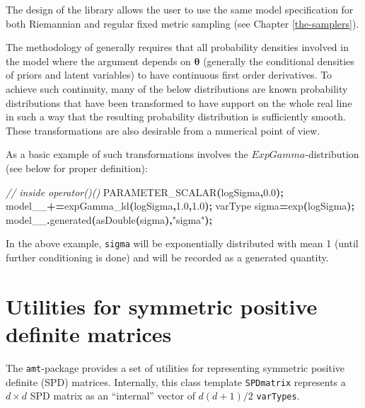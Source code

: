 \documentclass[
]{book}
\newenvironment{Shaded}{\begin{snugshade}}{\end{snugshade}}
\newcommand{\CommentTok}[1]{\textcolor[rgb]{0.56,0.35,0.01}{\textit{#1}}}
\newcommand{\FloatTok}[1]{\textcolor[rgb]{0.00,0.00,0.81}{#1}}
\newcommand{\NormalTok}[1]{#1}
\newcommand{\OperatorTok}[1]{\textcolor[rgb]{0.81,0.36,0.00}{\textbf{#1}}}
\newcommand{\StringTok}[1]{\textcolor[rgb]{0.31,0.60,0.02}{#1}}
\begin{document}
The design of the library allows the user to use the same model specification for both Riemannian and regular fixed metric sampling (see Chapter \ref{the-samplers}).

The methodology of \citet{kleppe_amt} generally requires that all probability densities involved in the model where the argument depends on \(\boldsymbol \theta\) (generally the conditional densities of priors and latent variables) to have continuous first order derivatives. To achieve such continuity, many of the below distributions are known probability distributions that have been transformed to have support on the whole real line in such a way that the resulting probability distribution is sufficiently smooth. These transformations are also desirable from a numerical point of view.

As a basic example of such transformations involves the \(ExpGamma\)-distribution (see below for proper definition):

\begin{Shaded}
\begin{Highlighting}[]
\CommentTok{// inside operator()()}
\NormalTok{PARAMETER\_SCALAR}\OperatorTok{(}\NormalTok{logSigma}\OperatorTok{,}\FloatTok{0.0}\OperatorTok{);}
\NormalTok{model\_\_}\OperatorTok{+=}\NormalTok{expGamma\_ld}\OperatorTok{(}\NormalTok{logSigma}\OperatorTok{,}\FloatTok{1.0}\OperatorTok{,}\FloatTok{1.0}\OperatorTok{);}
\NormalTok{varType sigma}\OperatorTok{=}\NormalTok{exp}\OperatorTok{(}\NormalTok{logSigma}\OperatorTok{);} 
\NormalTok{model\_\_}\OperatorTok{.}\NormalTok{generated}\OperatorTok{(}\NormalTok{asDouble}\OperatorTok{(}\NormalTok{sigma}\OperatorTok{),}\StringTok{"sigma"}\OperatorTok{);}
\end{Highlighting}
\end{Shaded}

In the above example, \texttt{sigma} will be exponentially distributed with mean 1 (until further conditioning is done) and will be recorded as a generated quantity.

\hypertarget{amt-SPD-matrix}{%
\section{Utilities for symmetric positive definite matrices}\label{amt-SPD-matrix}}

The \texttt{amt}-package provides a set of utilities for representing symmetric positive definite (SPD) matrices. Internally, this class template \texttt{SPDmatrix} represents a \(d \times d\) SPD matrix as an ``internal'' vector of \(d(d+1)/2\) \texttt{varTypes}.
\end{document}
